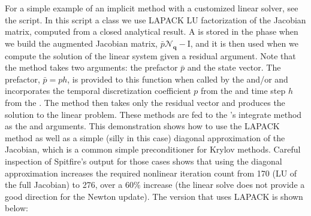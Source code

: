 \documentclass[letterpaper,10pt,english]{sphinxmanual}
\begin{document}
For a simple example of an implicit method with a customized linear solver, see the  script.
In this script a  class we use LAPACK LU factorization of the Jacobian matrix, computed from a closed analytical result.
A  is stored in the  phase when we build the augmented Jacobian matrix, \(\bar{p}\boldsymbol{\mathcal{N}}_{\boldsymbol{q}} - \mathrm{I}\),
and it is then used when we compute the solution of the linear system given a residual argument.
Note that the  method takes two arguments: the prefactor \(\bar{p}\) and the state vector.
The prefactor, \(\bar{p}=ph\), is provided to this function when called by the  and/or  and incorporates
the temporal discretization coefficient \(p\) from the  and time step \(h\) from the .
The  method then takes only the residual vector and produces the solution to the linear problem.
These methods are fed to the ’s integrate method as the  and  arguments.
This demonstration shows how to use the LAPACK method as well as a simple (silly in this case) diagonal approximation of the Jacobian,
which is a common simple preconditioner for Krylov methods.
Careful inspection of Spitfire’s output for those cases shows that using the diagonal approximation increases the required
nonlinear iteration count from 170 (LU of the full Jacobian) to 276, over a 60\% increase (the linear solve does not provide a good direction for the Newton update).
The version that uses LAPACK is shown below:
\end{document}
